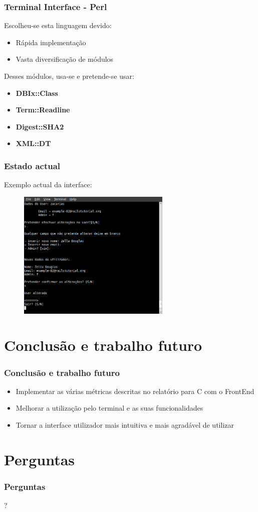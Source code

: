 \documentclass{beamer}
\begin{document}
\begin{frame} \frametitle{Terminal Interface - Perl}
Escolheu-se esta linguagem devido:
\begin{itemize}
 \item Rápida implementação
 \item Vasta diversificação de módulos
\end{itemize}
Desses módulos, usa-se e pretende-se usar:
\begin{itemize}
 \item \textbf{DBIx::Class}
 \item \textbf{Term::Readline}
 \item \textbf{Digest::SHA2}
 \item \textbf{XML::DT}
\end{itemize}
\end{frame}

\begin{frame} \frametitle{Estado actual}
 Exemplo actual da interface:
\begin{figure}[H]
\begin{center}
\includegraphics[width=0.65\textwidth]{imagens/zacarias}
\end{center}
\end{figure} 
\end{frame}


\section{Conclusão e trabalho futuro}
\begin{frame} \frametitle{Conclusão e trabalho futuro}
\begin{itemize}
\item Implementar as várias métricas descritas no relatório para C com o FrontEnd
\item Melhorar a utilização pelo terminal e as suas funcionalidades
\item Tornar a interface utilizador mais intuitiva e mais agradável de utilizar
\end{itemize}
\end{frame}

\section*{Perguntas}
\begin{frame} \frametitle{Perguntas}
\begin{center}\huge{?}\end{center}
\end{frame}
\end{document}
